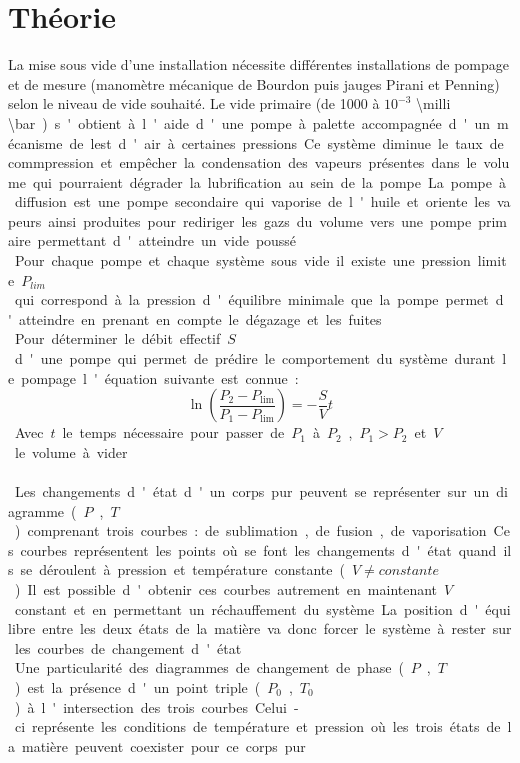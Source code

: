 \section{Théorie}

La mise sous vide d'une installation nécessite différentes installations de pompage et de mesure (manomètre mécanique de Bourdon puis jauges Pirani et Penning) selon le niveau de vide souhaité. Le vide primaire (de 1000 à \(10^{-3}\) \SI{\milli \bar}) s'obtient à l'aide d'une pompe à palette accompagnée d'un mécanisme de lest d'air à certaines pressions. Ce système diminue le taux de commpression et empêcher la condensation des vapeurs présentes dans le volume qui pourraient dégrader la lubrification au sein de la pompe. La pompe à diffusion est une pompe secondaire qui vaporise de l'huile et oriente les vapeurs ainsi produites pour rediriger les gazs du volume vers une pompe primaire permettant d'atteindre un vide poussé. \\
Pour chaque pompe et chaque système sous vide il existe une pression limite \(P_{lim}\) qui correspond à la pression d'équilibre minimale que la pompe permet d'atteindre en prenant en compte le dégazage et les fuites. \\
Pour déterminer le débit effectif \(S\) d'une pompe qui permet de prédire le comportement du système durant le pompage l'équation suivante est connue:
\begin{equation}
    \ln(\frac{P_\textrm{2} - P_\textrm{lim}}{P_\textrm{1} - P_\textrm{lim}}) = -\frac{S}{V}t
\end{equation}
Avec \(t\) le temps nécessaire pour passer de \(P_\textrm{1}\) à \(P_\textrm{2}\), \(P_\textrm{1} > P_\textrm{2}\) et \(V\) le volume à vider \cite{notice}. \\
\\
Les changements d'état d'un corps pur peuvent se représenter sur un diagramme (\(P\), \(T\)) comprenant trois courbes: de sublimation, de fusion, de vaporisation. Ces courbes représentent les points où se font les changements d'état quand ils se déroulent à pression et température constante (\(V \neq constante\)). Il est possible d'obtenir ces courbes autrement en maintenant \(V\) constant et en permettant un réchauffement du système. La position d'équilibre entre les deux états de la matière va donc forcer le système à rester sur les courbes de changement d'état. \\
Une particularité des diagrammes de changement de phase (\(P\), \(T\)) est la présence d'un point triple (\(P_0\), \(T_0\)) à l'intersection des trois courbes. Celui-ci représente les conditions de température et pression où les trois états de la matière peuvent coexister pour ce corps pur.\\
